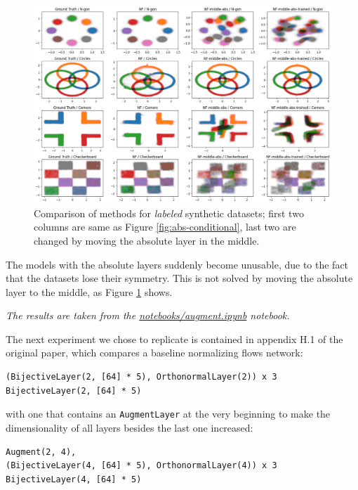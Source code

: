 \begin{figure}[p]
    \centering
    \includegraphics[width=.85\linewidth]{images/synthetic/abs-conditional-2.png}
    \caption{Comparison of methods for \textit{labeled} synthetic datasets; first two columns are same as Figure \ref{fig:abs-conditional}, last two are changed by moving the absolute layer in the middle.}
    \label{fig:abs-conditional-2}
\end{figure}


The models with the absolute layers suddenly become unusable, due to the fact that the datasets lose their symmetry. This is not solved by moving the absolute layer to the middle, as Figure \ref{fig:abs-conditional-2} shows.

\textit{The results are taken from the \href{https://github.com/xiaoxiae/GNNFinal2024/blob/main/notebooks/augment.ipynb}{notebooks/augment.ipynb} notebook.}

The next experiment we chose to replicate is contained in appendix H.1 of the original paper, which compares a baseline normalizing flows network:

\begin{verbatim}
(BijectiveLayer(2, [64] * 5), OrthonormalLayer(2)) x 3
BijectiveLayer(2, [64] * 5)
\end{verbatim}

with one that contains an \texttt{AugmentLayer} at the very beginning to make the dimensionality of all layers besides the last one increased:

\begin{verbatim}
Augment(2, 4),
(BijectiveLayer(4, [64] * 5), OrthonormalLayer(4)) x 3
BijectiveLayer(4, [64] * 5)
\end{verbatim}

